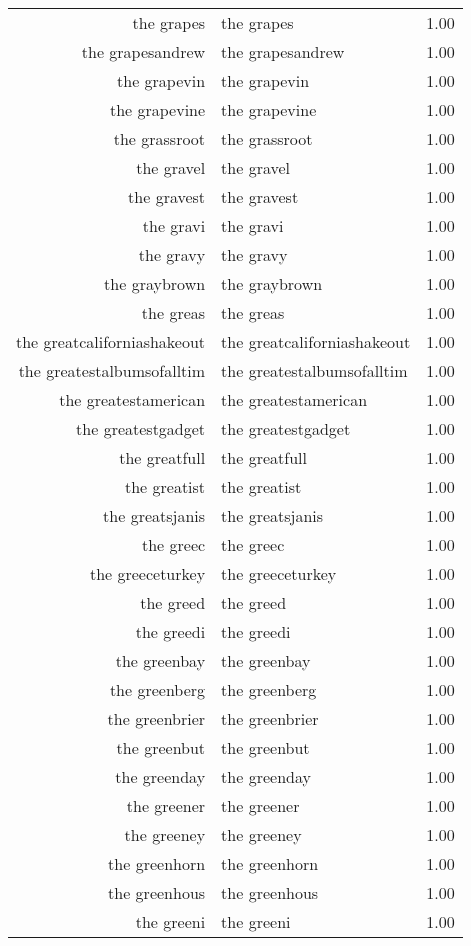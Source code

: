 \begin{table}[ht]
\begin{tabular}{rlr}
  the grapes & the grapes & 1.00 \\ 
  the grapesandrew & the grapesandrew & 1.00 \\ 
  the grapevin & the grapevin & 1.00 \\ 
  the grapevine & the grapevine & 1.00 \\ 
  the grassroot & the grassroot & 1.00 \\ 
  the gravel & the gravel & 1.00 \\ 
  the gravest & the gravest & 1.00 \\ 
  the gravi & the gravi & 1.00 \\ 
  the gravy & the gravy & 1.00 \\ 
  the graybrown & the graybrown & 1.00 \\ 
  the greas & the greas & 1.00 \\ 
  the greatcaliforniashakeout & the greatcaliforniashakeout & 1.00 \\ 
  the greatestalbumsofalltim & the greatestalbumsofalltim & 1.00 \\ 
  the greatestamerican & the greatestamerican & 1.00 \\ 
  the greatestgadget & the greatestgadget & 1.00 \\ 
  the greatfull & the greatfull & 1.00 \\ 
  the greatist & the greatist & 1.00 \\ 
  the greatsjanis & the greatsjanis & 1.00 \\ 
  the greec & the greec & 1.00 \\ 
  the greeceturkey & the greeceturkey & 1.00 \\ 
  the greed & the greed & 1.00 \\ 
  the greedi & the greedi & 1.00 \\ 
  the greenbay & the greenbay & 1.00 \\ 
  the greenberg & the greenberg & 1.00 \\ 
  the greenbrier & the greenbrier & 1.00 \\ 
  the greenbut & the greenbut & 1.00 \\ 
  the greenday & the greenday & 1.00 \\ 
  the greener & the greener & 1.00 \\ 
  the greeney & the greeney & 1.00 \\ 
  the greenhorn & the greenhorn & 1.00 \\ 
  the greenhous & the greenhous & 1.00 \\ 
  the greeni & the greeni & 1.00 \\ 

\end{tabular}
\end{table}

